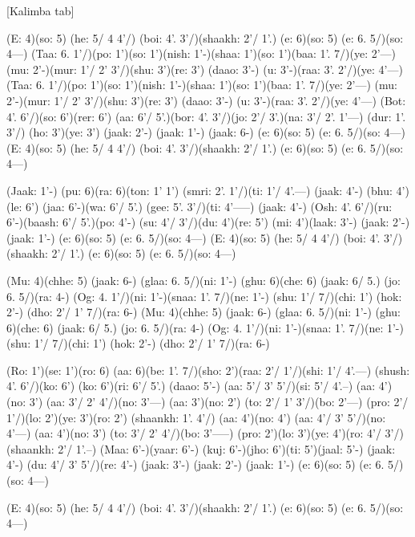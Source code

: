 \documentclass[11pt]{article}
\begin{document}
[Kalimba tab]
\begin{jianpu}
(E: 4)(so: 5) (he: 5/ 4 4'/) (boi: 4'. 3'/)(shaakh: 2'/ 1'.) (e: 6)(so: 5) (e: 6. 5/)(so: 4---)
(Taa: 6. 1'/)(po: 1')(so: 1')(nish: 1'-)(shaa: 1')(so: 1')(baa: 1'. 7/)(ye: 2'---)
(mu: 2'-)(mur: 1'/ 2' 3'/)(shu: 3')(re: 3') (daao: 3'-) (u: 3'-)(raa: 3'. 2'/)(ye: 4'---)
(Taa: 6. 1'/)(po: 1')(so: 1')(nish: 1'-)(shaa: 1')(so: 1')(baa: 1'. 7/)(ye: 2'---)
(mu: 2'-)(mur: 1'/ 2' 3'/)(shu: 3')(re: 3') (daao: 3'-) (u: 3'-)(raa: 3'. 2'/)(ye: 4'---)
(Bot: 4'. 6'/)(so: 6')(rer: 6') (aa: 6'/ 5'.)(bor: 4'. 3'/)(jo: 2'/ 3'.)(na: 3'/ 2'. 1'---)
(dur: 1'. 3'/) (ho: 3')(ye: 3') (jaak: 2'-) (jaak: 1'-)
(jaak: 6-) (e: 6)(so: 5) (e: 6. 5/)(so: 4---)
(E: 4)(so: 5) (he: 5/ 4 4'/) (boi: 4'. 3'/)(shaakh: 2'/ 1'.) (e: 6)(so: 5) (e: 6. 5/)(so: 4---)

(Jaak: 1'-) (pu: 6)(ra: 6)(ton: 1' 1') (smri: 2'. 1'/)(ti: 1'/ 4'.---)
(jaak: 4'-) (bhu: 4')(le: 6') (jaa: 6'-)(wa: 6'/ 5'.) (gee: 5'. 3'/)(ti: 4'-----) (jaak: 4'-)
(Osh: 4'. 6'/)(ru: 6'-)(baash: 6'/ 5'.)(po: 4'-) (su: 4'/ 3'/)(du: 4')(re: 5')
(mi: 4')(laak: 3'-) (jaak: 2'-) (jaak: 1'-) (e: 6)(so: 5) (e: 6. 5/)(so: 4---)
(E: 4)(so: 5) (he: 5/ 4 4'/) (boi: 4'. 3'/)(shaakh: 2'/ 1'.) (e: 6)(so: 5) (e: 6. 5/)(so: 4---)

(Mu: 4)(chhe: 5) (jaak: 6-) (glaa: 6. 5/)(ni: 1'-) (ghu: 6)(che: 6) (jaak: 6/ 5.) (jo: 6. 5/)(ra: 4-)
(Og: 4. 1'/)(ni: 1'-)(snaa: 1'. 7/)(ne: 1'-) (shu: 1'/ 7/)(chi: 1') (hok: 2'-) (dho: 2'/ 1' 7/)(ra: 6-)
(Mu: 4)(chhe: 5) (jaak: 6-) (glaa: 6. 5/)(ni: 1'-) (ghu: 6)(che: 6) (jaak: 6/ 5.) (jo: 6. 5/)(ra: 4-)
(Og: 4. 1'/)(ni: 1'-)(snaa: 1'. 7/)(ne: 1'-) (shu: 1'/ 7/)(chi: 1') (hok: 2'-) (dho: 2'/ 1' 7/)(ra: 6-)

(Ro: 1')(se: 1')(ro: 6) (aa: 6)(be: 1'. 7/)(sho: 2')(raa: 2'/ 1'/)(shi: 1'/ 4'.---)
(shush: 4'. 6'/)(ko: 6') (ko: 6')(ri: 6'/ 5'.) (daao: 5'-)
(aa: 5'/ 3' 5'/)(si: 5'/ 4'.--) (aa: 4')(no: 3') (aa: 3'/ 2' 4'/)(no: 3'---)
(aa: 3')(no: 2') (to: 2'/ 1' 3'/)(bo: 2'---)
(pro: 2'/ 1'/)(lo: 2')(ye: 3')(ro: 2') (shaankh: 1'. 4'/) (aa: 4')(no: 4') (aa: 4'/ 3' 5'/)(no: 4'---)
(aa: 4')(no: 3') (to: 3'/ 2' 4'/)(bo: 3'-----) (pro: 2')(lo: 3')(ye: 4')(ro: 4'/ 3'/) (shaankh: 2'/ 1'.--)
(Maa: 6'-)(yaar: 6'-) (kuj: 6'-)(jho: 6')(ti: 5')(jaal: 5'-) (jaak: 4'-)
(du: 4'/ 3' 5'/)(re: 4'-) (jaak: 3'-) (jaak: 2'-) (jaak: 1'-) (e: 6)(so: 5) (e: 6. 5/)(so: 4---)

(E: 4)(so: 5) (he: 5/ 4 4'/) (boi: 4'. 3'/)(shaakh: 2'/ 1'.) (e: 6)(so: 5) (e: 6. 5/)(so: 4---)
\end{jianpu}
\end{document}
